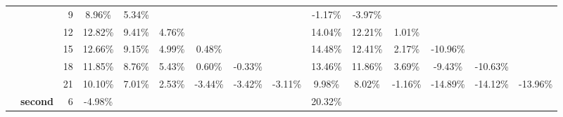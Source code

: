 \begin{table}[t]
{\begin{tabular}{ccrcccccccccccc}
          & \textcolor[rgb]{ .502,  .502,  .502}{} & 9     & \cellcolor[rgb]{ .89,  .922,  .969}8.96\% & \cellcolor[rgb]{ .929,  .949,  .98}5.34\% &       &       &       &       & \cellcolor[rgb]{ .984,  .961,  .973}-1.17\% & \cellcolor[rgb]{ .984,  .902,  .914}-3.97\% &       &       &       &  \\
          & \textcolor[rgb]{ .502,  .502,  .502}{} & 12    & \cellcolor[rgb]{ .847,  .89,  .953}12.82\% & \cellcolor[rgb]{ .886,  .918,  .965}9.41\% & \cellcolor[rgb]{ .937,  .953,  .984}4.76\% &       &       &       & \cellcolor[rgb]{ .835,  .878,  .945}14.04\% & \cellcolor[rgb]{ .855,  .894,  .953}12.21\% & \cellcolor[rgb]{ .98,  .98,  .996}1.01\% &       &       &  \\
          & \textcolor[rgb]{ .502,  .502,  .502}{} & 15    & \cellcolor[rgb]{ .851,  .89,  .953}12.66\% & \cellcolor[rgb]{ .89,  .918,  .965}9.15\% & \cellcolor[rgb]{ .933,  .953,  .984}4.99\% & \cellcolor[rgb]{ .984,  .988,  1}0.48\% &       &       & \cellcolor[rgb]{ .827,  .878,  .945}14.48\% & \cellcolor[rgb]{ .851,  .894,  .953}12.41\% & \cellcolor[rgb]{ .965,  .973,  .992}2.17\% & \cellcolor[rgb]{ .98,  .757,  .765}-10.96\% &       &  \\
          & \textcolor[rgb]{ .502,  .502,  .502}{} & 18    & \cellcolor[rgb]{ .859,  .898,  .957}11.85\% & \cellcolor[rgb]{ .894,  .922,  .969}8.76\% & \cellcolor[rgb]{ .929,  .949,  .98}5.43\% & \cellcolor[rgb]{ .984,  .984,  1}0.60\% & \cellcolor[rgb]{ .984,  .98,  .992}-0.33\% &       & \cellcolor[rgb]{ .839,  .886,  .949}13.46\% & \cellcolor[rgb]{ .859,  .898,  .957}11.86\% & \cellcolor[rgb]{ .949,  .961,  .988}3.69\% & \cellcolor[rgb]{ .98,  .788,  .8}-9.43\% & \cellcolor[rgb]{ .98,  .765,  .773}-10.63\% &  \\
          & \textcolor[rgb]{ .502,  .502,  .502}{} & 21    & \cellcolor[rgb]{ .878,  .91,  .961}10.10\% & \cellcolor[rgb]{ .914,  .937,  .976}7.01\% & \cellcolor[rgb]{ .961,  .969,  .992}2.53\% & \cellcolor[rgb]{ .984,  .914,  .925}-3.44\% & \cellcolor[rgb]{ .984,  .914,  .925}-3.42\% & \cellcolor[rgb]{ .984,  .922,  .933}-3.11\% & \cellcolor[rgb]{ .878,  .914,  .965}9.98\% & \cellcolor[rgb]{ .902,  .929,  .973}8.02\% & \cellcolor[rgb]{ .984,  .961,  .973}-1.16\% & \cellcolor[rgb]{ .976,  .675,  .682}-14.89\% & \cellcolor[rgb]{ .976,  .69,  .698}-14.12\% & \cellcolor[rgb]{ .976,  .694,  .702}-13.96\% \\
    \cmidrule(r){2-3}
          & \multicolumn{1}{l}{\textcolor[rgb]{ .502,  .502,  .502}{\textbf{second}}} & 6     & \cellcolor[rgb]{ .984,  .882,  .894}-4.98\% &       &       &       &       &       & \cellcolor[rgb]{ .765,  .831,  .922}20.32\% &       &       &       &       &  \\

\end{tabular}}
\end{table}
